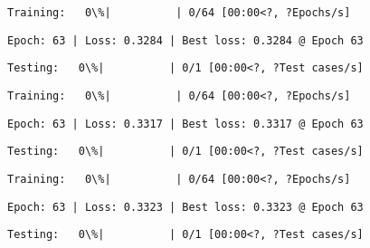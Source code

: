 \documentclass[11pt]{article}
\begin{document}
    
    
    \begin{Verbatim}[commandchars=\\\{\}]
Training:   0\%|          | 0/64 [00:00<?, ?Epochs/s]
    \end{Verbatim}

    
    \begin{Verbatim}[commandchars=\\\{\}]
Epoch: 63 | Loss: 0.3284 | Best loss: 0.3284 @ Epoch 63
    \end{Verbatim}

    
    \begin{Verbatim}[commandchars=\\\{\}]
Testing:   0\%|          | 0/1 [00:00<?, ?Test cases/s]
    \end{Verbatim}

    
    
    \begin{Verbatim}[commandchars=\\\{\}]
Training:   0\%|          | 0/64 [00:00<?, ?Epochs/s]
    \end{Verbatim}

    
    \begin{Verbatim}[commandchars=\\\{\}]
Epoch: 63 | Loss: 0.3317 | Best loss: 0.3317 @ Epoch 63
    \end{Verbatim}

    
    \begin{Verbatim}[commandchars=\\\{\}]
Testing:   0\%|          | 0/1 [00:00<?, ?Test cases/s]
    \end{Verbatim}

    
    
    \begin{Verbatim}[commandchars=\\\{\}]
Training:   0\%|          | 0/64 [00:00<?, ?Epochs/s]
    \end{Verbatim}

    
    \begin{Verbatim}[commandchars=\\\{\}]
Epoch: 63 | Loss: 0.3323 | Best loss: 0.3323 @ Epoch 63
    \end{Verbatim}

    
    \begin{Verbatim}[commandchars=\\\{\}]
Testing:   0\%|          | 0/1 [00:00<?, ?Test cases/s]
    \end{Verbatim}
\end{document}
